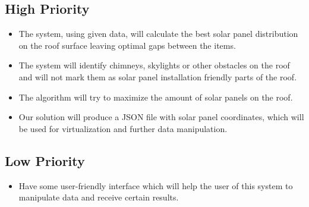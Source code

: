 \documentclass[a4paper,12pt,fleqn]{article}
\begin{document}
\subsection{High Priority}
\begin{itemize}
    \item The system, using given data, will calculate the best solar panel distribution on the roof surface leaving optimal gaps between the items.
    
    \item The system will identify chimneys, skylights or other obstacles on the roof and will not mark them as solar panel installation friendly parts of the roof. 
    
    \item The algorithm will try to maximize the amount of solar panels on the roof.
    
    \item Our solution will produce a JSON file with solar panel coordinates, which will be used for virtualization and further data manipulation.
\end{itemize}

\subsection{Low Priority}
\begin{itemize}
    \item Have some user-friendly interface which will help the user of this system to manipulate data and receive certain results.  
\end{itemize}

\newpage
\end{document}
